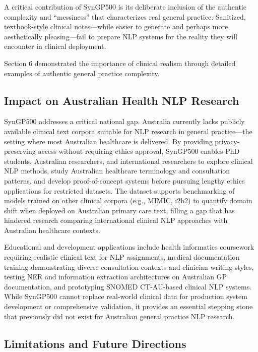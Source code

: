 \documentclass[11pt]{article}
\begin{document}
A critical contribution of SynGP500 is its deliberate inclusion of the authentic complexity and ``messiness'' that characterizes real general practice. Sanitized, textbook-style clinical notes—while easier to generate and perhaps more aesthetically pleasing—fail to prepare NLP systems for the reality they will encounter in clinical deployment.

Section 6 demonstrated the importance of clinical realism through detailed examples of authentic general practice complexity.

\subsection{Impact on Australian Health NLP Research}

SynGP500 addresses a critical national gap. Australia currently lacks publicly available clinical text corpora suitable for NLP research in general practice—the setting where most Australian healthcare is delivered. By providing privacy-preserving access without requiring ethics approval, SynGP500 enables PhD students, Australian researchers, and international researchers to explore clinical NLP methods, study Australian healthcare terminology and consultation patterns, and develop proof-of-concept systems before pursuing lengthy ethics applications for restricted datasets. The dataset supports benchmarking of models trained on other clinical corpora (e.g., MIMIC, i2b2) to quantify domain shift when deployed on Australian primary care text, filling a gap that has hindered research comparing international clinical NLP approaches with Australian healthcare contexts.

Educational and development applications include health informatics coursework requiring realistic clinical text for NLP assignments, medical documentation training demonstrating diverse consultation contexts and clinician writing styles, testing NER and information extraction architectures on Australian GP documentation, and prototyping SNOMED CT-AU-based clinical NLP systems. While SynGP500 cannot replace real-world clinical data for production system development or comprehensive validation, it provides an essential stepping stone that previously did not exist for Australian general practice NLP research.

\subsection{Limitations and Future Directions}
\end{document}
